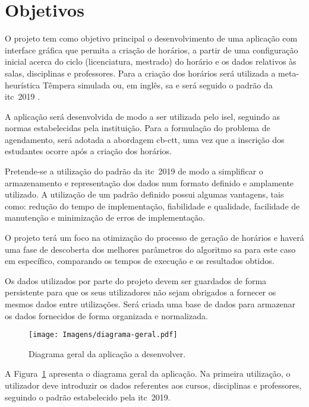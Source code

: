 \section{Objetivos}

O projeto tem como objetivo principal o desenvolvimento de uma aplicação com interface gráfica que permita a criação de horários, a partir de uma configuração inicial acerca do ciclo (licenciatura, mestrado) do horário e os dados relativos às salas, disciplinas e professores. Para a criação dos horários será utilizada a meta-heurística Têmpera simulada ou, em inglês, \gls{sa} e será seguido o padrão da \gls{itc}~2019 \cite{itc2019-Website}.

A aplicação será desenvolvida de modo a ser utilizada pelo \gls{isel}, seguindo as normas estabelecidas pela instituição. Para a formulação do problema de agendamento, será adotada a abordagem \gls{cb-ctt}, uma vez que a inscrição dos estudantes ocorre após a criação dos horários.

Pretende-se a utilização do padrão da \gls{itc}~2019 de modo a simplificar o armazenamento e representação dos dados num formato definido e amplamente utilizado. A utilização de um padrão definido possui algumas vantagens, tais como: redução do tempo de implementação, fiabilidade e qualidade, facilidade de manutenção e minimização de erros de implementação.

O projeto terá um foco na otimização do processo de geração de horários e haverá uma fase de descoberta dos melhores parâmetros do algoritmo \gls{sa} para este caso em específico, comparando os tempos de execução e os resultados obtidos.

Os dados utilizados por parte do projeto devem ser guardados de forma persistente para que os seus utilizadores não sejam obrigados a fornecer os mesmos dados entre utilizações. Será criada uma base de dados para armazenar os dados fornecidos de forma organizada e normalizada.

\begin{figure}[htbp]
    \centering
    \texttt{[image: Imagens/diagrama-geral.pdf]}
    \caption{Diagrama geral da aplicação a desenvolver.}
    \label{fig:diagrama-geral}
\end{figure}

A Figura~\ref{fig:diagrama-geral} apresenta o diagrama geral da aplicação. Na primeira utilização, o utilizador deve introduzir os dados referentes aos cursos, disciplinas e professores, seguindo o padrão estabelecido pela \gls{itc}~2019.

